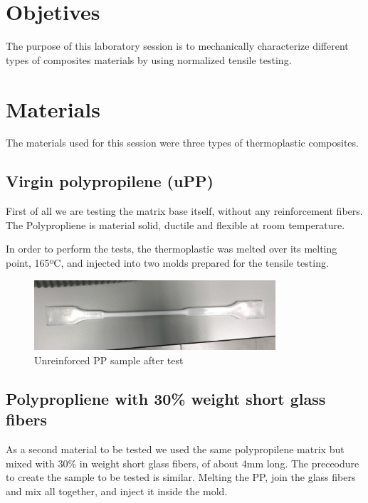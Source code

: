 \section{Objetives}

The purpose of this laboratory session is to mechanically characterize different
types of composites materials by using normalized tensile testing.\\

\section{Materials}

The materials used for this session were three types of thermoplastic composites.\\

\subsection{Virgin polypropilene (uPP)}

First of all we are testing the matrix base itself, without any reinforcement fibers.
The Polypropliene is material solid, ductile and flexible at room temperature.

In order to perform the tests, the thermoplastic was melted over its melting
point, 165ºC, and injected into two molds prepared for the tensile testing.\\

\begin{figure}[h]
	\centering
	\includegraphics[width=0.8\textwidth]{img/1_Unreinforced_PP.jpg}
	\caption[PP]{Unreinforced PP sample after test}
	\label{fig:unreinforced_PP}
\end{figure}

\subsection{Polypropliene with 30\% weight short glass fibers}

As a second material to be tested we used the same polypropilene matrix but mixed
with 30\% in weight short glass fibers, of about 4mm long. The preceodure to create
the sample to be tested is similar. Melting the PP, join the glass fibers and mix
all together, and inject it inside the mold.\\

